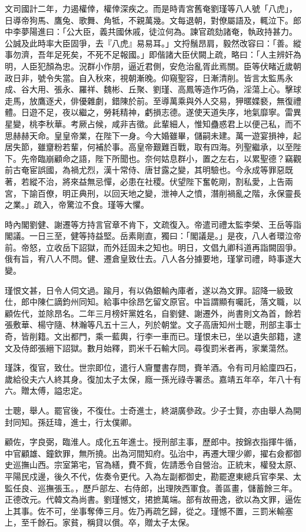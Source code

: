 \begin{pinyinscope}
文司國計二年，力遏權倖，權倖深疾之。而是時青宮舊奄劉瑾等八人號「八虎」，日導帝狗馬、鷹兔、歌舞、角牴，不親萬幾。文每退朝，對僚屬語及，輒泣下。郎中李夢陽進曰：「公大臣，義共國休戚，徒泣何為。諫官疏劾諸奄，執政持甚力。公誠及此時率大臣固爭，去『八虎』易易耳。」文捋鬚昂肩，毅然改容曰：「善。縱事勿濟，吾年足死矣，不死不足報國。」即偕諸大臣伏闕上疏，略曰：「人主辨奸為明，人臣犯顏為忠。況群小作朋，逼近君側，安危治亂胥此焉關。臣等伏睹近歲朝政日非，號令失當。自入秋來，視朝漸晚。仰窺聖容，日漸清削。皆言太監馬永成、谷大用、張永、羅祥、魏彬、丘聚、劉瑾、高鳳等造作巧偽，淫蕩上心。擊球走馬，放鷹逐犬，俳優雜劇，錯陳於前。至導萬乘與外人交易，狎暱媟褻，無復禮體。日遊不足，夜以繼之，勞耗精神，虧損志德。遂使天道失序，地氣靡寧。雷異星變，桃李秋華。考厥占候，咸非吉徵。此輩細人，惟知蠱惑君上以便己私，而不思赫赫天命。皇皇帝業，在陛下一身。今大婚雖畢，儲嗣未建。萬一遊宴損神，起居失節，雖齏粉若輩，何補於事。高皇帝艱難百戰，取有四海。列聖繼承，以至陛下。先帝臨崩顧命之語，陛下所聞也。奈何姑息群小，置之左右，以累聖德？竊觀前古奄宦誤國，為禍尤烈，漢十常侍、唐甘露之變，其明驗也。今永成等罪惡既著，若縱不治，將來益無忌憚，必患在社稷。伏望陛下奮乾剛，割私愛，上告兩宮，下諭百僚，明正典刑，以回天地之變，泄神人之憤，潛削禍亂之階，永保靈長之業。」疏入，帝驚泣不食。瑾等大懼。

時內閣劉健、謝遷等方持言官章不肯下，文疏復入。帝遣司禮太監李榮、王岳等詣閣議。一日三至，健等持益堅。岳素剛直，獨曰：「閣議是。」是夜，八人者環泣帝前。帝怒，立收岳下詔獄，而外廷固未之知也。明日，文倡九卿科道再詣闕固爭。俄有旨，宥八人不問。健、遷倉皇致仕去。八人各分據要地，瑾掌司禮，時事遂大變。

瑾恨文甚，日令人伺文過。踰月，有以偽銀輸內庫者，遂以為文罪。詔降一級致仕，郎中陳仁謫鈞州同知。給事中徐昂乞留文原官。中旨謂顯有囑託，落文職，以顧佐代，並除昂名。二年三月榜奸黨姓名，自劉健、謝遷外，尚書則文為首，餘若張敷華、楊守隨、林瀚等凡五十三人，列於朝堂。文子高唐知州士聰，刑部主事士奇，皆削籍。文出都門，乘一藍輿，行李一車而已。瑾恨未已，坐以遺失部籍，逮文及侍郎張縉下詔獄。數月始釋，罰米千石輸大同。尋復罰米者再，家業蕩然。

瑾誅，復官，致仕。世宗即位，遣行人齎璽書存問，賚羊酒。令有司月給廩四石，歲給役夫六人終其身。復加太子太保，廕一孫光祿寺署丞。嘉靖五年卒，年八十有六。贈太傅，謚忠定。

士聰，舉人。罷官後，不復仕。士奇進士，終湖廣參政。少子士賢，亦由舉人為開封同知。孫廷瑋，進士，行太僕卿。

顧佐，字良弼，臨淮人。成化五年進士。授刑部主事，歷郎中。按錦衣指揮牛循，中官顧雄、鐘欽罪，無所撓。出為河間知府。弘治中，再遷大理少卿，擢右僉都御史巡撫山西。宗室第宅，官為繕，費不貲，佐請悉令自營治。正統末，權發太原、平陽民戍邊，後久不代，佐奏令更代。入為左副都御史，勘罷遼東總兵官李杲、太監任良、巡撫張玉。，歷戶部左、右侍郎，出理陜西軍食。善區畫，儲蓄餘三年。正德改元。代韓文為尚書。劉瑾憾文，捃摭萬端。部有故冊逸，欲以為文罪，逼佐上其事。佐不可，坐事奪俸三月。佐乃再疏乞歸，從之。瑾憾不置，三罰米輸塞上，至千餘石。家貧，稱貸以償。卒，贈太子太保。


\end{pinyinscope}
